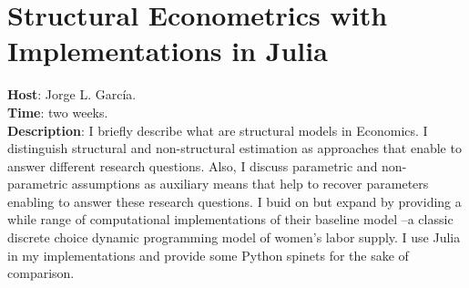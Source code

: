 \section{Structural Econometrics with Implementations in Julia}
\noindent \textbf{Host}: Jorge L. Garc\'{i}a.\\
\noindent \textbf{Time}: two weeks.\\
\noindent \textbf{Description}:  I  briefly describe what are structural models in Economics. I distinguish structural and non-structural estimation as approaches that enable to answer different research questions. Also, I discuss parametric and non-parametric assumptions as auxiliary means that help to recover parameters enabling to answer these research questions. I buid on \citet{keane2011structural} but expand by providing a while range of computational implementations of their baseline model --a classic discrete choice dynamic programming model of women's labor supply. I use Julia in my implementations and provide some Python spinets for the sake of comparison.

\clearpage


\clearpage

